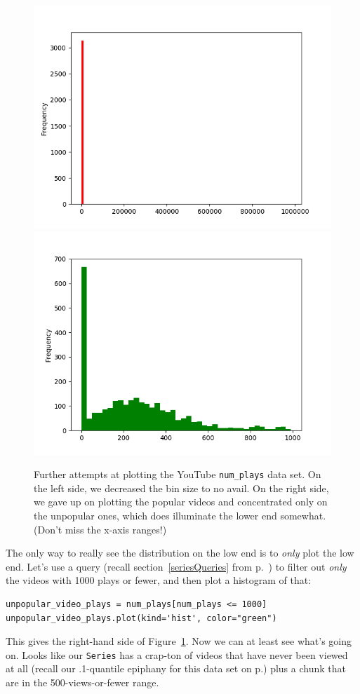 \begin{figure}[ht]
\centering
\includegraphics[width=.48\textwidth]{youtube2.png}
\includegraphics[width=.48\textwidth]{youtube3.png}
\caption{Further attempts at plotting the YouTube \texttt{num\_plays} data set.
On the left side, we decreased the bin size to no avail. On the right side, we
gave up on plotting the popular videos and concentrated only on the unpopular
ones, which does illuminate the lower end somewhat. (Don't miss the x-axis
ranges!)}
\label{fig:youtube23}
\end{figure}



The only way to really see the distribution on the low end is to \textit{only}
plot the low end. Let's use a query (recall section~\ref{seriesQueries} from
p.~\pageref{seriesQueries}) to filter out \textit{only} the videos with 1000
plays or fewer, and then plot a histogram of that:

\begin{Verbatim}[fontsize=\footnotesize,samepage=true,frame=single,framesep=3mm]
unpopular_video_plays = num_plays[num_plays <= 1000]
unpopular_video_plays.plot(kind='hist', color="green")
\end{Verbatim}

This gives the right-hand side of Figure~\ref{fig:youtube23}. Now we can at
least see what's going on. Looks like our \texttt{Series} has a crap-ton of
videos that have never been viewed at all (recall our .1-quantile epiphany for
this data set on p.\pageref{pointOneQuantileEpiphany}) plus a chunk that are in
the 500-views-or-fewer range.

